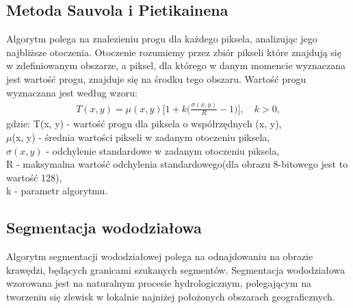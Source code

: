 \subsection{Metoda Sauvola i Pietikainena}
Algorytm polega na znalezieniu progu dla każdego piksela, analizując jego najbliższe otoczenia. Otoczenie rozumiemy przez zbiór pikseli które znajdują się w zdefiniowanym obszarze, a piksel, dla którego w danym momencie wyznaczana jest wartość progu, znajduje się na środku tego obszaru. Wartość progu wyznaczana jest według wzoru:
\begin{gather*}
  T(x, y) = \mu(x, y)\Big[1+k\big(\frac{\sigma(x, y)}{R} - 1\big)\Big], \quad k > 0,
\end{gather*}
gdzie:
T(x, y) - wartość progu dla piksela o współrzędnych (x, y),\\
$\mu$(x, y) - średnia wartości pikseli w zadanym otoczeniu piksela,\\
$\sigma(x, y)$ - odchylenie standardowe w zadanym otoczeniu piksela,\\
R - maksymalna wartość odchylenia standardowego(dla obrazu 8-bitowego jest to wartość 128),\\
k - parametr algorytmu. \\
\subsection{Segmentacja wododziałowa}
Algorytm segmentacji wododziałowej polega na odnajdowaniu na obrazie krawędzi, będących granicami szukanych segmentów. Segmentacja wododziałowa wzorowana jest na naturalnym procesie hydrologicznym, polegającym na tworzeniu się zlewisk w lokalnie najniżej położonych obszarach geograficznych. \\
